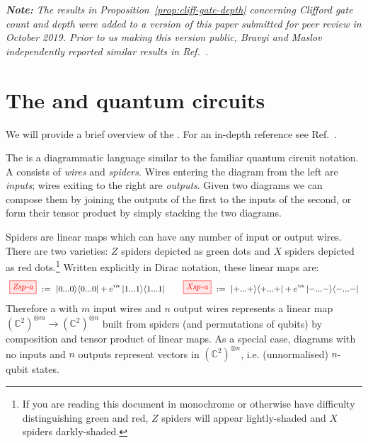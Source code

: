 \documentclass[a4paper,onecolumn,superscriptaddress,11pt,accepted=2020-04-27]{quantumarticle}
\newcommand{\bra}[1]{\ensuremath{\left\langle #1 \right|}}
\newcommand{\ket}[1]{\ensuremath{\left|  #1 \right\rangle}}
\newcommand{\ketbra}[2]{\ensuremath{\ket{#1}\!\bra{#2}}}
\theoremstyle{definition}
\begin{document}
\bigskip


\noindent \textit{\textbf{Note:} The results in Proposition~\ref{prop:cliff-gate-depth} concerning Clifford gate count and depth were added to a version of this paper submitted for peer review in October 2019. Prior to us making this version public, Bravyi and Maslov independently reported similar results in Ref.~\cite{bravyi2020hadamard}.}




\section{The \zxcalculus and quantum circuits}\label{sec:zx}

We will provide a brief overview of the \zxcalculus. For an in-depth
reference see Ref.~\cite{CKbook}.

The \zxcalculus is a diagrammatic language similar to the familiar
quantum circuit notation.  A \emph{\zxdiagram} consists of \emph{wires} and \emph{spiders}.  Wires entering the diagram from the left are \emph{inputs}; wires exiting to
the right are \emph{outputs}.  Given two diagrams we can compose them
by joining the outputs of the first to the inputs of the second, or
form their tensor product by simply stacking the two diagrams.

Spiders are linear maps which can have any number of input or output
wires.  There are two varieties: $Z$ spiders depicted as green dots and $X$ spiders depicted as red dots.\footnote{If you are reading this
  document in monochrome or otherwise have difficulty distinguishing green and red, $Z$ spiders will appear lightly-shaded and $X$ spiders darkly-shaded.} Written explicitly in Dirac notation, these linear maps are:
\[\textrm{
\small
$\tikzfig{Zsp-a} \ := \ \ketbra{\textrm{$0$...$0$}}{\textrm{$0$...$0$}} +
e^{i \alpha} \ketbra{\textrm{$1$...$1$}}{\textrm{$1$...$1$}} \hfill
\qquad
\hfill \tikzfig{Xsp-a} \ := \ \ketbra{\textrm{$+$...$+$}}{\textrm{$+$...$+$}} +
e^{i \alpha} \ketbra{\textrm{$-$...$-$}}{\textrm{$-$...$-$}}$
}
\]
Therefore a \zxdiagram with $m$ input wires and $n$ output wires represents a linear map $(\mathbb C^2)^{\otimes m} \to (\mathbb C^2)^{\otimes n}$ built from
spiders (and permutations of qubits) by composition and tensor product
of linear maps.  As a special case, diagrams with no inputs and $n$ outputs represent vectors in $(\mathbb C^2)^{\otimes n}$, i.e.
(unnormalised) $n$-qubit states.

\end{document}
